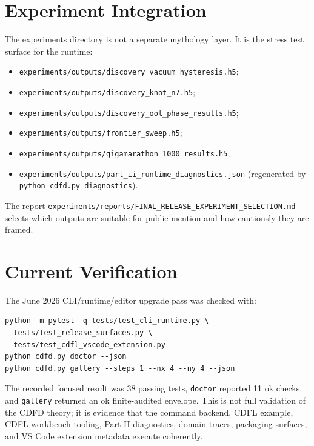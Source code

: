 \documentclass[12pt,a4paper]{article}
\begin{document}
\section{Experiment Integration}
The experiments directory is not a separate mythology layer. It is the stress
test surface for the runtime:
\begin{itemize}
    \item \texttt{experiments/outputs/discovery\_vacuum\_hysteresis.h5};
    \item \texttt{experiments/outputs/discovery\_knot\_n7.h5};
    \item \texttt{experiments/outputs/discovery\_ool\_phase\_results.h5};
    \item \texttt{experiments/outputs/frontier\_sweep.h5};
    \item \texttt{experiments/outputs/gigamarathon\_1000\_results.h5};
    \item \texttt{experiments/outputs/part\_ii\_runtime\_diagnostics.json}
    (regenerated by \texttt{python cdfd.py diagnostics}).
\end{itemize}
The report \texttt{experiments/reports/FINAL\_RELEASE\_EXPERIMENT\_SELECTION.md}
selects which outputs are suitable for public mention and how cautiously they
are framed.

\section{Current Verification}
The June 2026 CLI/runtime/editor upgrade pass was checked with:
\begin{verbatim}
python -m pytest -q tests/test_cli_runtime.py \
  tests/test_release_surfaces.py \
  tests/test_cdfl_vscode_extension.py
python cdfd.py doctor --json
python cdfd.py gallery --steps 1 --nx 4 --ny 4 --json
\end{verbatim}
The recorded focused result was 38 passing tests, \texttt{doctor} reported
11 ok checks, and \texttt{gallery} returned an ok finite-audited envelope. This
is not full validation of the CDFD theory; it is evidence that the command
backend, CDFL example, CDFL workbench tooling, Part II diagnostics, domain
traces, packaging surfaces, and VS Code extension metadata execute coherently.
\end{document}
